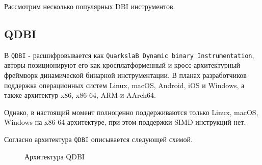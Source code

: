 Рассмотрим несколько популярных DBI инструментов.

\subsection{QDBI}

В \cite{QDBI} \texttt{QDBI} - расшифровывается как \texttt{QuarkslaB Dynamic binary Instrumentation}, авторы позиционируют его как кросплатформенный и кросс-архитектурный фреймворк динамической бинарной инструментации. В планах разработчиков поддержка операционных систем Linux, macOS, Android, iOS и Windows, а также архитектур  x86, x86-64, ARM и AArch64.

Однако, в настоящий момент полноценно поддерживаются только Linux, macOS, Windows на x86-64 архитектуре, при этом поддержки SIMD инструкций нет.

Согласно \cite{QDBI} архитектура \texttt{QDBI} описывается следующей схемой.
\begin{figure}[H]
    \caption{Архитектура QDBI}
    \label{fig:qdbi}
\end{figure}

